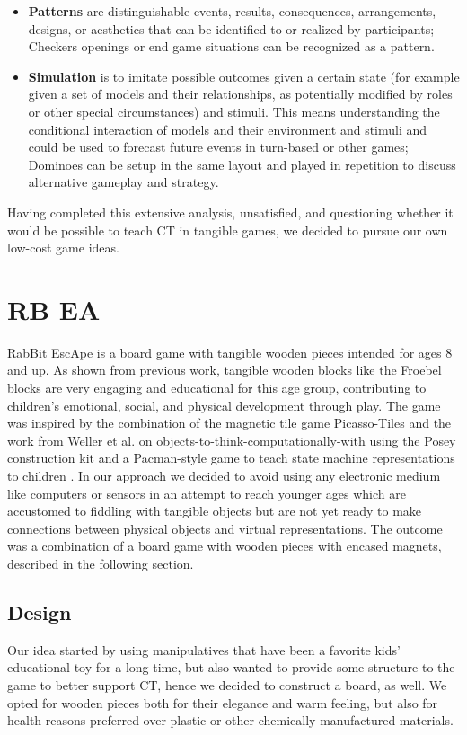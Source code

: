 \documentclass{acm_proc_article-sp}
\begin{document}
\begin{itemize}
  \item{\textbf{Patterns} are distinguishable events, results, consequences, arrangements, designs, or aesthetics that can be identified to or realized by participants; Checkers openings or end game situations can be recognized as a pattern.}
  \item{\textbf{Simulation} is to imitate possible outcomes given a certain state (for example given a set of models and their relationships, as potentially modified by roles or other special circumstances) and stimuli.
  This means understanding the conditional interaction of models and their environment and stimuli and could be used to forecast future events in turn-based or other games; Dominoes can be setup in the same layout and played in repetition to discuss alternative gameplay and strategy.}
\end{itemize}

Having completed this extensive analysis, unsatisfied, and questioning whether it would be possible to teach CT in tangible games, we decided to pursue our own low-cost game ideas.

\section{R{}B{} E{}A{}}
\label{sec:rabbit}
RabBit EscApe is a board game with tangible wooden pieces intended for ages 8 and up.
As shown from previous work, tangible wooden blocks like the Froebel blocks \cite{liebschner1992child} are very engaging and educational for this age group, contributing to children's emotional, social, and physical development through play.
The game was inspired by the combination of the magnetic tile game Picasso-Tiles \cite{picassotiles3d} and the work from Weller et al. on objects-to-think-computationally-with using the Posey construction kit and a Pacman-style game to teach state machine representations to children \cite{weller2008escape}.
In our approach we decided to avoid using any electronic medium like computers or sensors in an attempt to reach younger ages which are accustomed to fiddling with tangible objects but are not yet ready to make connections between physical objects and virtual representations.
The outcome was a combination of a board game with wooden pieces with encased magnets, described in the following section.

\subsection{Design}
\label{sec:design}
Our idea started by using manipulatives that have been a favorite kids' educational toy for a long time, but also wanted to provide some structure to the game to better support CT, hence we decided to construct a board, as well.
We opted for wooden pieces both for their elegance and warm feeling, but also for health reasons preferred over plastic or other chemically manufactured materials. 
\end{document}
